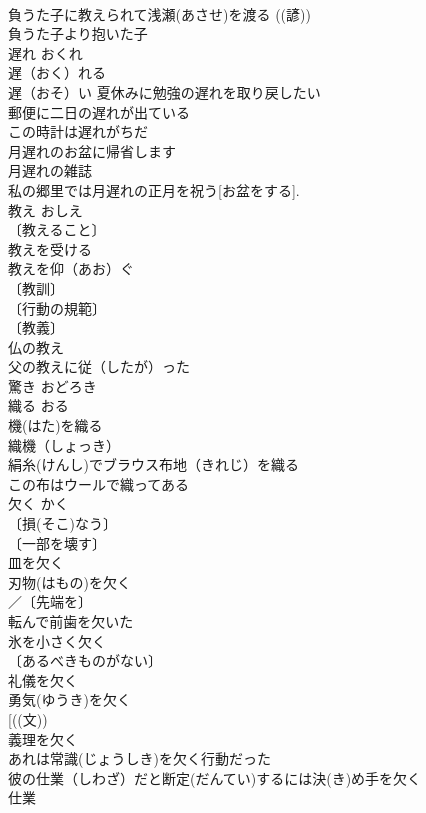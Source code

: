 \documentclass[8pt]{extreport}
\begin{document}
\begin{CJK}{UTF8}{min}
\\	負うた子に教えられて浅瀬(あさせ)を渡る ((諺)) 
\\	負うた子より抱いた子 
\\	遅れ	おくれ	
\\	遅（おく）れる 
\\	遅（おそ）い 夏休みに勉強の遅れを取り戻したい 
\\	郵便に二日の遅れが出ている 
\\	この時計は遅れがちだ 
\\	月遅れのお盆に帰省します 
\\	月遅れの雑誌　
\\	私の郷里では月遅れの正月を祝う[お盆をする]. 
\\	教え	おしえ	
\\	〔教えること〕
\\	教えを受ける 
\\	教えを仰（あお）ぐ 
\\	〔教訓〕
\\	〔行動の規範〕
\\	〔教義〕
\\	仏の教え 
\\	父の教えに従（したが）った 
\\	驚き	おどろき	
\\	織る	おる	
\\	機(はた)を織る 
\\	織機（しょっき）　
\\	絹糸(けんし)でブラウス布地（きれじ）を織る 
\\	この布はウールで織ってある 
\\	欠く	かく	
\\	〔損(そこ)なう〕
\\	〔一部を壊す〕
\\	皿を欠く 
\\	刃物(はもの)を欠く 
\\	／〔先端を〕
\\	転んで前歯を欠いた 
\\	氷を小さく欠く 
\\	〔あるべきものがない〕
\\	礼儀を欠く 
\\	勇気(ゆうき)を欠く 
\\	[((文))
\\	義理を欠く 
\\	あれは常識(じょうしき)を欠く行動だった 
\\	彼の仕業（しわざ）だと断定(だんてい)するには決(き)め手を欠く 
\\	仕業　

\end{CJK}
\end{document}
